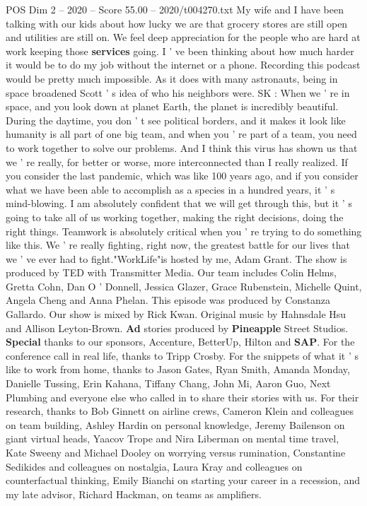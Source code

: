 \begin{textsample}{POS Dim 2 – 2020 – Score 55.00 – 2020/t004270.txt}
My wife and I have been talking with our kids about how lucky we are that grocery stores are still open and utilities are still on.
We feel deep appreciation for the people who are hard at work keeping those \textbf{services} going.
I ' ve been thinking about how much harder it would be to do my job without the internet or a phone.
Recording this podcast would be pretty much impossible.
As it does with many astronauts, being in space broadened Scott ' s idea of who his neighbors were.
SK : When we ' re in space, and you look down at planet Earth, the planet is incredibly beautiful.
During the daytime, you don ' t see political borders, and it makes it look like humanity is all part of one big team, and when you ' re part of a team, you need to work together to solve our problems.
And I think this virus has shown us that we ' re really, for better or worse, more interconnected than I really realized.
If you consider the last pandemic, which was like 100 years ago, and if you consider what we have been able to accomplish as a species in a hundred years, it ' s mind-blowing.
I am absolutely confident that we will get through this, but it ' s going to take all of us working together, making the right decisions, doing the right things.
Teamwork is absolutely critical when you ' re trying to do something like this.
We ' re really fighting, right now, the greatest battle for our lives that we ' ve ever had to fight."WorkLife"is hosted by me, Adam Grant.
The show is produced by TED with Transmitter Media.
Our team includes Colin Helms, Gretta Cohn, Dan O ' Donnell, Jessica Glazer, Grace Rubenstein, Michelle Quint, Angela Cheng and Anna Phelan.
This episode was produced by Constanza Gallardo.
Our show is mixed by Rick Kwan.
Original music by Hahnsdale Hsu and Allison Leyton-Brown. \textbf{Ad} stories produced by \textbf{Pineapple} Street Studios. \textbf{Special} thanks to our sponsors, Accenture, BetterUp, Hilton and \textbf{SAP}.
For the conference call in real life, thanks to Tripp Crosby.
For the snippets of what it ' s like to work from home, thanks to Jason Gates, Ryan Smith, Amanda Monday, Danielle Tussing, Erin Kahana, Tiffany Chang, John Mi, Aaron Guo, Next Plumbing and everyone else who called in to share their stories with us.
For their research, thanks to Bob Ginnett on airline crews, Cameron Klein and colleagues on team building, Ashley Hardin on personal knowledge, Jeremy Bailenson on giant virtual heads, Yaacov Trope and Nira Liberman on mental time travel, Kate Sweeny and Michael Dooley on worrying versus rumination, Constantine Sedikides and colleagues on nostalgia, Laura Kray and colleagues on counterfactual thinking, Emily Bianchi on starting your career in a recession, and my late advisor, Richard Hackman, on teams as amplifiers.

\end{textsample}

